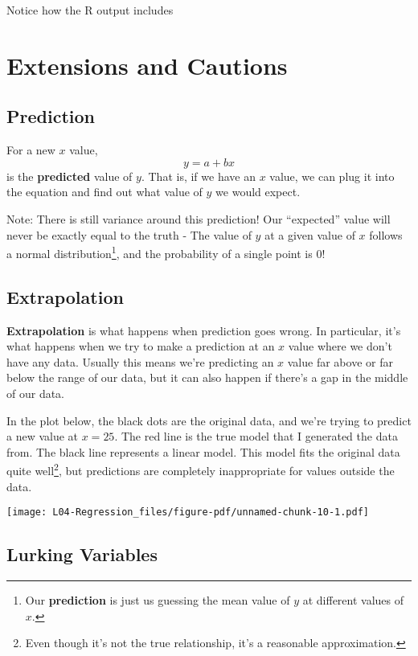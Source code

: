 \documentclass[
  letterpaper,
  DIV=11,
  numbers=noendperiod]{scrreprt}
\begin{document}
Notice how the R output includes

\hypertarget{extensions-and-cautions}{%
\section{Extensions and Cautions}\label{extensions-and-cautions}}

\hypertarget{prediction}{%
\subsection{Prediction}\label{prediction}}

For a new \(x\) value, \[y = a + bx\] is the \textbf{predicted} value of
\(y\). That is, if we have an \(x\) value, we can plug it into the
equation and find out what value of \(y\) we would expect.

Note: There is still variance around this prediction! Our ``expected''
value will never be exactly equal to the truth - The value of \(y\) at a
given value of \(x\) follows a normal distribution\footnote{Our
  \textbf{prediction} is just us guessing the mean value of \(y\) at
  different values of \(x\).}, and the probability of a single point is
0!

\hypertarget{extrapolation}{%
\subsection{Extrapolation}\label{extrapolation}}

\textbf{Extrapolation} is what happens when prediction goes wrong. In
particular, it's what happens when we try to make a prediction at an
\(x\) value where we don't have any data. Usually this means we're
predicting an \(x\) value far above or far below the range of our data,
but it can also happen if there's a gap in the middle of our data.

In the plot below, the black dots are the original data, and we're
trying to predict a new value at \(x = 25\). The red line is the true
model that I generated the data from. The black line represents a linear
model. This model fits the original data quite well\footnote{Even though
  it's not the true relationship, it's a reasonable approximation.}, but
predictions are completely inappropriate for values outside the data.

\texttt{[image: L04-Regression\_files/figure-pdf/unnamed-chunk-10-1.pdf]}

\hypertarget{lurking-variables}{%
\subsection{Lurking Variables}\label{lurking-variables}}
\end{document}
